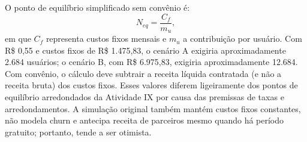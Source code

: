 O ponto de equilíbrio simplificado sem convênio é:
\[
N_{eq}=\frac{C_f}{m_u},
\]
em que $C_f$ representa custos fixos mensais e $m_u$ a contribuição por usuário. Com R\$ 0,55 e custos fixos de R\$ 1.475,83, o cenário A exigiria aproximadamente 2.684 usuários; o cenário B, com R\$ 6.975,83, exigiria aproximadamente 12.684. Com convênio, o cálculo deve subtrair a receita líquida contratada (e não a receita bruta) dos custos fixos. Esses valores diferem ligeiramente dos pontos de equilíbrio arredondados da Atividade IX por causa das premissas de taxas e arredondamentos. A simulação original também mantém custos fixos constantes, não modela churn e antecipa receita de parceiros mesmo quando há período gratuito; portanto, tende a ser otimista.
